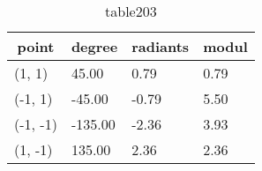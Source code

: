 \newcommand*{\thead}[1]{\multicolumn{1}{c}{\bfseries #1}}%
\newcommand*{\unitHead}[1]{\multicolumn{1}{c}{\si{#1}}}%

\begin{table}[h]%
\centering%
\begin{tabular}{llll}%
\toprule%
\thead{point}&\thead{degree}&\thead{radiants}&\thead{modul}\\
\toprule%
(1, 1)	&	45.00	&	0.79	&	0.79 \\%
(-1, 1)	&	-45.00	&	-0.79	&	5.50 \\%
(-1, -1)	&	-135.00	&	-2.36	&	3.93 \\%
(1, -1)	&	135.00	&	2.36	&	2.36 \\%
\bottomrule%
\end{tabular}%
\caption{table203}%
\label{tab:table203}%
\end{table}%
